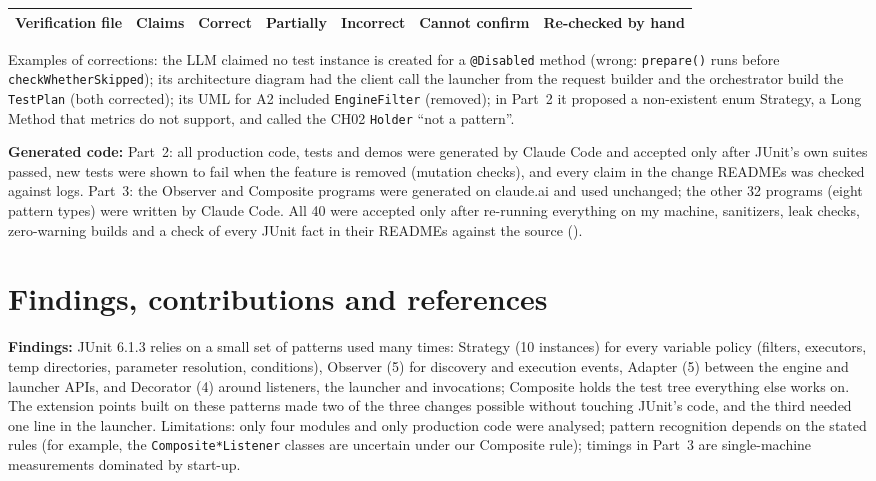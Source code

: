 \documentclass[11pt,a4paper]{article}
\newcommand{\entry}[1]{\textbf{#1:} }
\begin{document}
\begin{tabular}{@{}lrrrrrr@{}}\toprule
Verification file & Claims & Correct & Partially & Incorrect & Cannot confirm & Re-checked by hand\\\midrule
\bottomrule\end{tabular}

Examples of corrections: the LLM claimed no test instance is created for a \texttt{@Disabled} method (wrong: \texttt{prepare()} runs before \texttt{checkWhetherSkipped}); its architecture diagram had the client call the launcher from the request builder and the orchestrator build the \texttt{TestPlan} (both corrected); its UML for A2 included \texttt{EngineFilter} (removed); in Part~2 it proposed a non-existent enum Strategy, a Long Method that metrics do not support, and called the CH02 \texttt{Holder} ``not a pattern''.

\entry{Generated code}Part~2: all production code, tests and demos were generated by Claude Code and accepted only after JUnit's own suites passed, new tests were shown to fail when the feature is removed (mutation checks), and every claim in the change READMEs was checked against logs. Part~3: the Observer and Composite programs were generated on claude.ai and used unchanged; the other 32 programs (eight pattern types) were written by Claude Code. All 40 were accepted only after re-running everything on my machine, sanitizers, leak checks, zero-warning builds and a check of every JUnit fact in their READMEs against the source ().

\section{Findings, contributions and references}
\entry{Findings}JUnit 6.1.3 relies on a small set of patterns used many times: Strategy (10 instances) for every variable policy (filters, executors, temp directories, parameter resolution, conditions), Observer (5) for discovery and execution events, Adapter (5) between the engine and launcher APIs, and Decorator (4) around listeners, the launcher and invocations; Composite holds the test tree everything else works on. The extension points built on these patterns made two of the three changes possible without touching JUnit's code, and the third needed one line in the launcher. Limitations: only four modules and only production code were analysed; pattern recognition depends on the stated rules (for example, the \texttt{Composite*Listener} classes are uncertain under our Composite rule); timings in Part~3 are single-machine measurements dominated by start-up.
\end{document}
